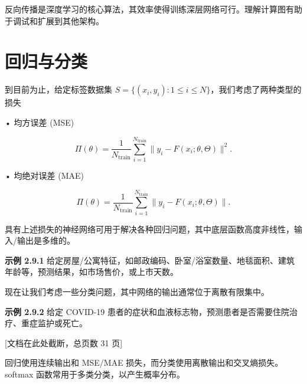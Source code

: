 \begin{mycomment}
反向传播是深度学习的核心算法，其效率使得训练深层网络可行。理解计算图有助于调试和扩展到其他架构。
\end{mycomment}

\section{回归与分类}

到目前为止，给定标签数据集 $S = \{(x_i, y_i): 1 \leq i \leq N\}$，我们考虑了两种类型的损失

• 均方误差 (MSE)

\[
\Pi(\theta) = \frac{1}{N_{\text{train}}} \sum_{i=1}^{N_{\text{train}}} \| y_i - F(x_i; \theta, \Theta) \|^2.
\]

• 均绝对误差 (MAE)

\[
\Pi(\theta) = \frac{1}{N_{\text{train}}} \sum_{i=1}^{N_{\text{train}}} \| y_i - F(x_i; \theta, \Theta) \|.
\]

具有上述损失的神经网络可用于解决各种回归问题，其中底层函数高度非线性，输入/输出是多维的。

\textbf{示例 2.9.1} 给定房屋/公寓特征，如邮政编码、卧室/浴室数量、地毯面积、建筑年龄等，预测结果，如市场售价，或上市天数。

现在让我们考虑一些分类问题，其中网络的输出通常位于离散有限集中。

\textbf{示例 2.9.2} 给定 COVID-19 患者的症状和血液标志物，预测患者是否需要住院治疗、重症监护或死亡。

[文档在此处截断，总页数 31 页]

\begin{mycomment}
回归使用连续输出和 MSE/MAE 损失，而分类使用离散输出和交叉熵损失。softmax 函数常用于多类分类，以产生概率分布。
\end{mycomment}

\newpage